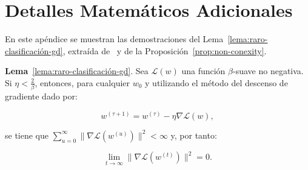 
\chapter{Detalles Matemáticos Adicionales}\label{ap:apendiceA}

En este apéndice se muestran las demostraciones del Lema~\ref{lema:raro-clasificación-gd}, extraída de~\cite{Soudry2024} y de la Proposición~\ref{prop:non-conexity}.

\textbf{Lema}~\ref{lema:raro-clasificación-gd}. Sea $\mathcal{L}(w)$ una función $\beta$-suave no negativa. Si $\eta < \frac{2}{\beta}$, entonces, para cualquier $w_0$ y utilizando el método del descenso de gradiente dado por:

\[
    w^{(\tau + 1)} = w^{(\tau)} - \eta \nabla \mathcal{L}(w),
\]

se tiene que $\sum_{u=0}^{\infty} \| \nabla\mathcal{L}(w^{(u)}) \|^{2} < \infty$ y, por tanto:

\[
    \lim \limits_{t \to \infty} \| \nabla\mathcal{L}(w^{(t)}) \|^{2} = 0.
\]

